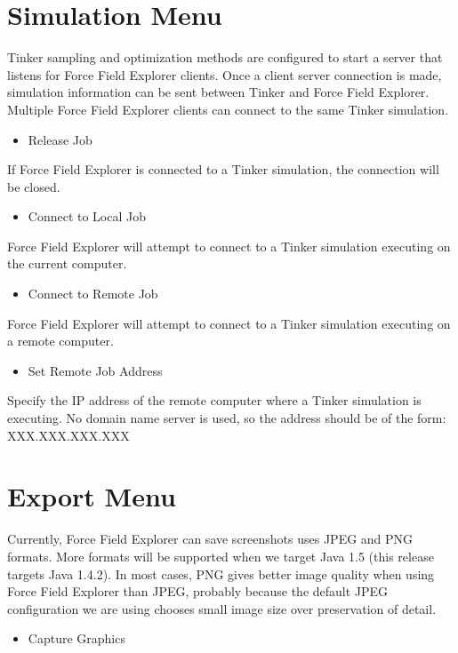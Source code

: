 \documentclass[letterpaper,11pt,english]{sphinxmanual}
\begin{document}
\section{Simulation Menu}
\label{\detokenize{text/menus:simulation-menu}}
Tinker sampling and optimization methods are configured to start a server that listens for Force Field Explorer clients. Once a client \textendash{} server connection is made, simulation information can be sent between Tinker and Force Field Explorer. Multiple Force Field Explorer clients can connect to the same Tinker simulation.
\begin{itemize}
\item {} 
Release Job

\end{itemize}

If Force Field Explorer is connected to a Tinker simulation, the connection will be closed.
\begin{itemize}
\item {} 
Connect to Local Job

\end{itemize}

Force Field Explorer will attempt to connect to a Tinker simulation executing on the current computer.
\begin{itemize}
\item {} 
Connect to Remote Job

\end{itemize}

Force Field Explorer will attempt to connect to a Tinker simulation executing on a remote computer.
\begin{itemize}
\item {} 
Set Remote Job Address

\end{itemize}

Specify the IP address of the remote computer where a Tinker simulation is executing. No domain name server is used, so the address should be of the form: XXX.XXX.XXX.XXX


\section{Export Menu}
\label{\detokenize{text/menus:export-menu}}
Currently, Force Field Explorer can save screenshots uses JPEG and PNG formats. More formats will be supported when we target Java 1.5 (this release targets Java 1.4.2). In most cases, PNG gives better image quality when using Force Field Explorer than JPEG, probably because the default JPEG configuration we are using chooses small image size over preservation of detail.
\begin{itemize}
\item {} 
Capture Graphics

\end{itemize}
\end{document}
